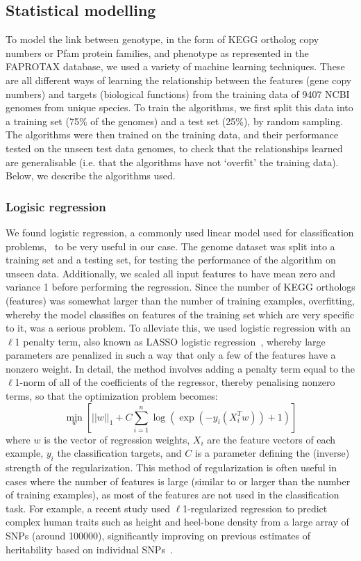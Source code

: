 \documentclass[10pt,letterpaper]{article}
\begin{document}
\subsection*{Statistical modelling}
To model the link between genotype, in the form of KEGG ortholog copy numbers or Pfam protein families, and phenotype as represented in the FAPROTAX database, we used a variety of machine learning techniques. These are all different ways of learning the relationship between the features (gene copy numbers) and targets (biological functions) from the training data of 9407 NCBI genomes from unique species. To train the algorithms, we first split this data into a training set (75\% of the genomes) and a test set (25\%), by random sampling. The algorithms were then trained on the training data, and their performance tested on the unseen test data genomes, to check that the relationships learned are generalisable (i.e. that the algorithms have not `overfit' the training data). Below, we describe the algorithms used.

\subsubsection*{Logisic regression}
We found logistic regression, a commonly used linear model used for classification problems,~\cite{Hastie2009a,Freedman2009} to be very useful in our case. The genome dataset was split into a training set and a testing set, for testing the performance of the algorithm on unseen data. Additionally, we scaled all input features to have mean zero and variance 1 before performing the regression. Since the number of KEGG orthologs (features) was somewhat larger than the number of training examples, overfitting, whereby the model classifies on features of the training set which are very specific to it, was a serious problem. To alleviate this, we used logistic regression with an $\ell$1 penalty term, also known as LASSO logistic regression~\cite{Lee2006}, whereby large parameters are penalized in such a way that only a few of the features have a nonzero weight. In detail, the method involves adding a penalty term equal to the $\ell$1-norm of all of the coefficients of the regressor, thereby penalising nonzero terms, so that the optimization problem becomes:
\begin{equation}
\min_{w}\left[||w||_1 + C\sum_{i=1}^{n}\log\left(\exp(-y_i(X_i^T w )) + 1\right)\right]
\end{equation}
where $w$ is the vector of regression weights, $X_i$ are the feature vectors of each example, $y_i$ the classification targets, and $C$ is a parameter defining the (inverse) strength of the regularization. This method of regularization is often useful in cases where the number of features is large (similar to or larger than the number of training examples), as most of the features are not used in the classification task. For example, a recent study used $\ell$1-regularized regression to predict complex human traits such as height and heel-bone density from a large array of SNPs (around 100000), significantly improving on previous estimates of heritability based on individual SNPs~\cite{Lello2017}. 
\end{document}
